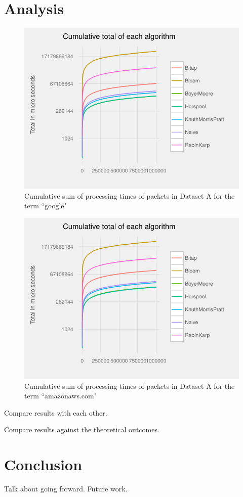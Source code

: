 \documentclass{article}
\begin{document}
\section{Analysis}

\begin{figure}[h!bt]
  \centering
  \includegraphics[width=\textwidth]{graphs/cum_sum_packets_google.pdf}
  \caption{Cumulative sum of processing times of packets in Dataset A for the term ``google"}
\end{figure}

\begin{figure}[h!bt]
  \centering
  \includegraphics[width=\textwidth]{graphs/cum_sum_packets_amazonaws-com.pdf}
  \caption{Cumulative sum of processing times of packets in Dataset A for the term ``amazonaws.com"}
\end{figure}



Compare results with each other.

Compare results against the theoretical outcomes.

\section{Conclusion}
Talk about going forward. Future work.
\nocite{*}




\end{document}
